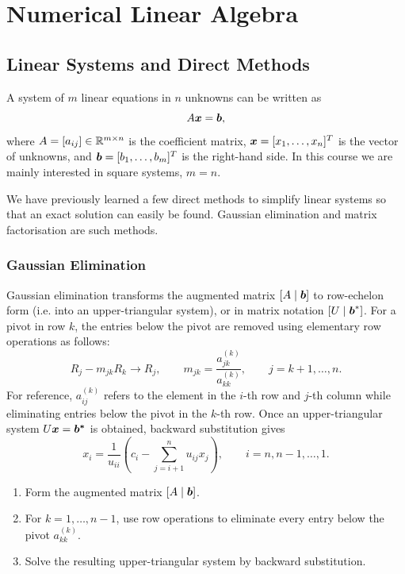 \chapter{Numerical Linear Algebra}

\section{Linear Systems and Direct Methods}

A system of $m$ linear equations in $n$ unknowns can be written as
\[
  A\boldsymbol{x}=\boldsymbol{b},
\]
where $A=[a_{ij}]\in\mathbb{R}^{m\times n}$ is the coefficient matrix,
$\boldsymbol{x}=[x_1,\ldots,x_n]^T$ is the vector of unknowns, and
$\boldsymbol{b}=[b_1,\ldots,b_m]^T$ is the right-hand side.  In this course we are mainly interested in square systems, $m=n$.

We have previously learned a few direct methods to simplify linear systems so that an exact solution can easily be found. Gaussian elimination and matrix factorisation are such methods.

\subsection{Gaussian Elimination}

Gaussian elimination transforms the augmented matrix $[A\mid \boldsymbol{b}]$ to row-echelon form (i.e. into an upper-triangular system), or in matrix notation $[U\mid \boldsymbol{b}^*]$. For a pivot in row $k$, the entries below the pivot are removed using elementary row operations as follows:
\[
 R_j-m_{jk}R_k \rightarrow R_j,
 \qquad
 m_{jk}=\frac{a_{jk}^{(k)}}{a_{kk}^{(k)}},
 \qquad j=k+1,\ldots,n.
\]
For reference, $a_{ij}^{(k)}$ refers to the element in the $i$-th row and $j$-th column while eliminating entries below the pivot in the $k$-th row.
Once an upper-triangular system $U\boldsymbol{x}=\boldsymbol{b^*}$ is obtained, backward substitution gives
\[
 x_i=\frac{1}{u_{ii}}
 \left(c_i-\sum_{j=i+1}^{n}u_{ij}x_j\right),
 \qquad i=n,n-1,\ldots,1.
\]

\begin{algorithm}
\begin{enumerate}
  \item Form the augmented matrix $[A\mid \boldsymbol{b}]$.
  \item For $k=1,\ldots,n-1$, use row operations to eliminate every entry below the pivot $a_{kk}^{(k)}$.
  \item Solve the resulting upper-triangular system by backward substitution.
\end{enumerate}
\end{algorithm}

